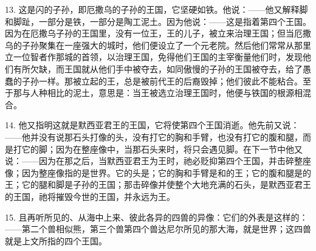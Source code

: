 13. 这是闪的子孙，即厄撒乌的子孙的王国，它坚硬如铁。他说：——他又解释脚和脚趾，一部分是铁，一部分是陶工泥土。因为他说：——这是指着第四个王国。因为在厄撒乌子孙的王国里，没有一位王，王的儿子，被立来治理王国；但当厄撒乌的子孙聚集在一座强大的城时，他们便设立了一个元老院。然后他们常常从那里立一位智者作那城的首领，以治理王国，免得他们王国的主宰衡量他们时，发现他们有所欠缺，而王国就从他们手中被夺去，如同傲慢的子孙的王国被夺去，给了愚蠢的子孙一样。那被立起的王，总是被前代王的后裔毁掉；他们彼此不能粘合。至于那与人种相比的泥土，意思是：当王被选立治理王国时，他便与铁国的根源相混合。\par

14. 他又指明这就是默西亚君王的王国，它将使第四个王国消逝。他先前又说：——他并没有说那石头打像的头，没有打它的胸和手臂，也没有打它的腹和腿，而是打它的脚；因为在整座像中，当那石头来时，将只会遇见脚。在下一节中他又说：——因为在那之后，当默西亚君王为王时，祂必贬抑第四个王国，并击碎整座像；因为整座像指的是世界。它的头是；它的胸和手臂是和的王；它的腹和腿是的王；它的腿和脚是子孙的王国；那击碎像并使整个大地充满的石头，是默西亚君王的王国，祂将摧毁今世的王国，并永远为王。\par

15. 且再听所见的、从海中上来、彼此各异的四兽的异像：它们的外表是这样的：——第二个兽相似熊，第三个兽第四个兽达尼尔所见的那大海，就是世界；这四兽就是上文所指的四个王国。\par

